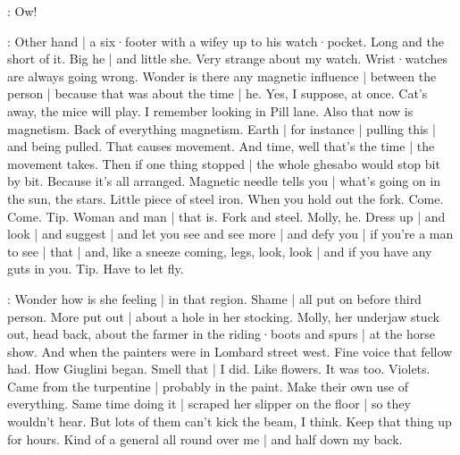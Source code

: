 \Bloom:
Ow!

\Bloom:
Other hand |
a six·footer with a wifey up to his watch·pocket.
Long and the short of it.
Big he |
and little she.
Very strange about my watch.
Wrist·watches are always going wrong.
Wonder is there any magnetic influence |
between the person |
because that was about the time |
he.
Yes,
I suppose,
at once.
Cat's away,
the mice will play.
I remember looking in Pill lane.
Also that now is magnetism.
Back of everything magnetism.
Earth |
for instance |
pulling this |
and being pulled.
That causes movement.
And time,
well that's the time |
the movement takes.
Then if one thing stopped |
the whole ghesabo would stop bit by bit.%
Because it's all arranged.
Magnetic needle tells you |
what's going on in the sun,
the stars.
Little piece of steel iron.
When you hold out the fork.
Come.
Come.
Tip.
Woman and man |
that is.
Fork and steel.
Molly,
he.
Dress up |
and look |
and suggest |
and let you see and see more |
and defy you |
if you're a man to see |
that |
and,
like a sneeze coming,
legs,
look,
look |
and if you have any guts in you.
Tip.
Have to let fly.

\Bloom:
Wonder how is she feeling |
in that region.
Shame |
all put on before third person.
More put out |
about a hole in her stocking.
Molly,
her underjaw stuck out,
head back,
about the farmer in the riding·boots and spurs |
at the horse show.%
And when the painters were in Lombard street west.
Fine voice that fellow had.
How Giuglini began.
Smell that |
I did.
Like flowers.
It was too.
Violets.
Came from the turpentine |
probably in the paint.
Make their own use of everything.
Same time doing it |
scraped her slipper on the floor |
so they wouldn't hear.
But lots of them can't kick the beam,
I think.
Keep that thing up for hours.
Kind of a general all round over me |
and half down my back.

